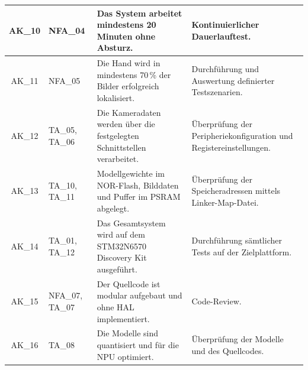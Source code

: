 \begin{longtable}{|c|p{1.65cm}|p{}|p{}|}
    \hline
    AK\_10 & NFA\_04 & Das System arbeitet mindestens 20 Minuten ohne Absturz. & Kontinuierlicher Dauerlauftest. \\
    \hline
    AK\_11 & NFA\_05 & Die Hand wird in mindestens 70\,\% der Bilder erfolgreich lokalisiert. & Durchführung und Auswertung definierter Testszenarien. \\
    \hline
    AK\_12 & TA\_05, TA\_06 & Die Kameradaten werden über die festgelegten Schnittstellen verarbeitet. & Überprüfung der Peripheriekonfiguration und Registereinstellungen. \\
    \hline
    AK\_13 & TA\_10, TA\_11 & Modellgewichte im NOR-Flash, Bilddaten und Puffer im PSRAM abgelegt. & Überprüfung der Speicheradressen mittels Linker-Map-Datei. \\
    \hline
    AK\_14 & TA\_01, TA\_12 & Das Gesamtsystem wird auf dem STM32N6570 Discovery Kit ausgeführt. & Durchführung sämtlicher Tests auf der Zielplattform. \\
    \hline
    AK\_15 & NFA\_07, TA\_07 & Der Quellcode ist modular aufgebaut und ohne HAL implementiert. & Code-Review. \\
    \hline
    AK\_16 & TA\_08 & Die Modelle sind quantisiert und für die NPU optimiert. & Überprüfung der Modelle und des Quellcodes. \\
    \hline
\end{longtable}

